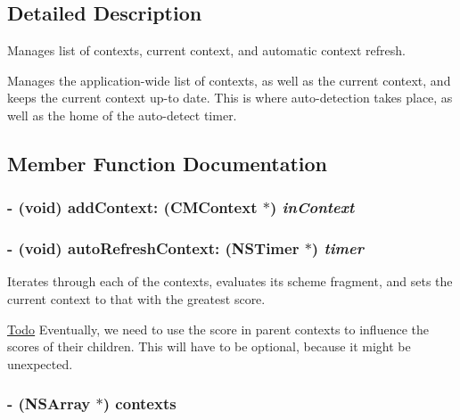 \subsection{Detailed Description}
Manages list of contexts, current context, and automatic context refresh. 

Manages the application-wide list of contexts, as well as the current context, and keeps the current context up-to date. This is where auto-detection takes place, as well as the home of the auto-detect timer. 

\subsection{Member Function Documentation}
\hypertarget{interface_c_m_context_controller_9ada89df5ea4d23429cf0df7ea058c22}{
\subsubsection[addContext:]{\setlength{\rightskip}{0pt plus 5cm}- (void) addContext: ({\bf CMContext} $\ast$) {\em inContext}}}
\label{interface_c_m_context_controller_9ada89df5ea4d23429cf0df7ea058c22}


\hypertarget{interface_c_m_context_controller_f7513bfc5b0449fac6a28d39abfa4b79}{
\subsubsection[autoRefreshContext:]{\setlength{\rightskip}{0pt plus 5cm}- (void) autoRefreshContext: (NSTimer $\ast$) {\em timer}}}
\label{interface_c_m_context_controller_f7513bfc5b0449fac6a28d39abfa4b79}


Iterates through each of the contexts, evaluates its scheme fragment, and sets the current context to that with the greatest score.

\begin{Desc}
\item[\hyperlink{todo__todo000004}{Todo}]Eventually, we need to use the score in parent contexts to influence the scores of their children. This will have to be optional, because it might be unexpected. \end{Desc}
\hypertarget{interface_c_m_context_controller_4d59f2e4274f438d12924d0545a4c048}{
\subsubsection[contexts]{\setlength{\rightskip}{0pt plus 5cm}- (NSArray $\ast$) {\bf contexts} }}
\label{interface_c_m_context_controller_4d59f2e4274f438d12924d0545a4c048}


